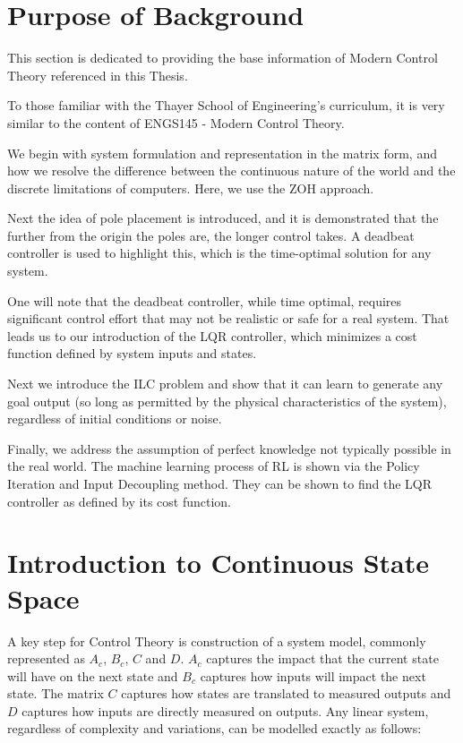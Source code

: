 

\FloatBarrier\section{Purpose of Background} %
This section is dedicated to providing the base information of Modern Control Theory referenced in this Thesis.

To those familiar with the Thayer School of Engineering's curriculum, it is very similar to the content of ENGS145 - Modern Control Theory.

We begin with system formulation and representation in the matrix form, and how we resolve the difference between the continuous nature of the world and the discrete limitations of computers. Here, we use the \ac{ZOH} approach. 

Next the idea of pole placement is introduced, and it is demonstrated that the further from the origin the poles are, the longer control takes. A deadbeat controller is used to highlight this, which is the time-optimal solution for any system.

One will note that the deadbeat controller, while time optimal, requires significant control effort that may not be realistic or safe for a real system. That leads us to our introduction of the \ac{LQR} controller, which minimizes a cost function defined by system inputs and states. 

Next we introduce the \ac{ILC} problem and show that it can learn to generate any goal output (so long as permitted by the physical characteristics of the system), regardless of initial conditions or noise. 

Finally, we address the assumption of perfect knowledge not typically possible in the real world. The machine learning process of \ac{RL} is shown via the Policy Iteration and Input Decoupling method. They can be shown to find the \ac{LQR} controller as defined by its cost function. 

\FloatBarrier\section{Introduction to Continuous State Space} %
A key step for Control Theory is construction of a system model, commonly represented as $A_c$, $B_c$, $C$ and $D$. $A_c$ captures the impact that the current state will have on the next state and $B_c$ captures how inputs will impact the next state. The matrix $C$ captures how states are translated to measured outputs and $D$ captures how inputs are directly measured on outputs. Any linear system, regardless of complexity and variations, can be modelled exactly as follows:

